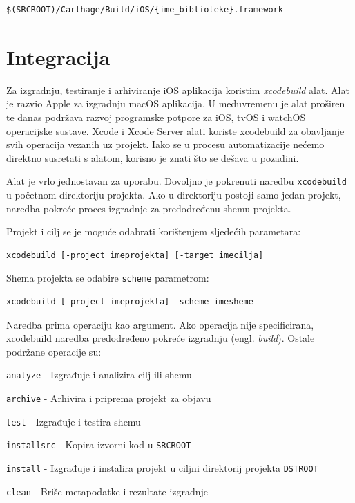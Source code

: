 \documentclass[times, utf8, diplomski, numeric]{fer}
\newcommand{\eng}[1]{(engl. \textit{#1})}
\begin{document}
\begin{appendices}
\begin{verbatim}
$(SRCROOT)/Carthage/Build/iOS/{ime_biblioteke}.framework
\end{verbatim}


\section{Integracija}

Za izgradnju, testiranje i arhiviranje iOS aplikacija koristim \textit{xcodebuild} alat. Alat je razvio Apple za izgradnju macOS aplikacija. U međuvremenu je alat proširen te danas podržava razvoj programske potpore za iOS, tvOS i watchOS operacijske sustave. Xcode i Xcode Server alati koriste xcodebuild za obavljanje svih operacija vezanih uz projekt. Iako se u procesu automatizacije nećemo direktno susretati s alatom, korisno je znati što se dešava u pozadini.

Alat je vrlo jednostavan za uporabu. Dovoljno je pokrenuti naredbu \verb|xcodebuild| u početnom direktoriju projekta. Ako u direktoriju postoji samo jedan projekt, naredba pokreće proces izgradnje za predodređenu shemu projekta.

Projekt i cilj se je moguće odabrati korištenjem sljedećih parametara:

\begin{verbatim}
xcodebuild [-project imeprojekta] [-target imecilja]
\end{verbatim}

Shema projekta se odabire \verb|scheme| parametrom:

\begin{verbatim}
xcodebuild [-project imeprojekta] -scheme imesheme
\end{verbatim}

Naredba prima operaciju kao argument. Ako operacija nije specificirana, xcodebuild naredba predodređeno pokreće izgradnju \eng{build}. Ostale podržane operacije su:

\verb|analyze| - Izgrađuje i analizira cilj ili shemu

\verb|archive| - Arhivira i priprema projekt za objavu

\verb|test| - Izgrađuje i testira shemu

\verb|installsrc| - Kopira izvorni kod u \verb|SRCROOT|

\verb|install| - Izgrađuje i instalira projekt u ciljni direktorij projekta \verb|DSTROOT|

\verb|clean| - Briše metapodatke i rezultate izgradnje


\end{appendices}
\end{document}
